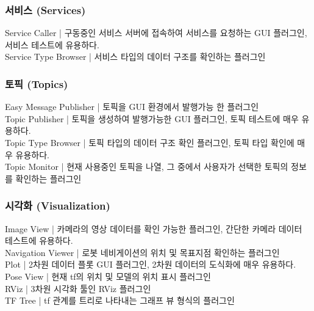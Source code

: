 \subsubsection{서비스 (Services)}
Service Caller | 구동중인 서비스 서버에 접속하여 서비스를 요청하는 GUI 플러그인, 서비스 테스트에 유용하다.\\
Service Type Browser | 서비스 타입의 데이터 구조를 확인하는 플러그인\\
\subsubsection{토픽 (Topics)}
Easy Message Publisher | 토픽을 GUI 환경에서 발행가능 한 플러그인\\
Topic Publisher | 토픽을 생성하여 발행가능한 GUI 플러그인, 토픽 테스트에 매우 유용하다.\\
Topic Type Browser | 토픽 타입의 데이터 구조 확인 플러그인, 토픽 타입 확인에 매우 유용하다.\\
Topic Monitor | 현재 사용중인 토픽을 나열, 그 중에서 사용자가 선택한 토픽의 정보를 확인하는 플러그인\\
\subsubsection{시각화 (Visualization)}
Image View | 카메라의 영상 데이터를 확인 가능한 플러그인, 간단한 카메라 데이터 테스트에 유용하다.\\
Navigation Viewer | 로봇 네비게이션의 위치 및 목표지점 확인하는 플러그인\\
Plot | 2차원 데이터 플롯 GUI 플러그인, 2차원 데이터의 도식화에 매우 유용하다.\\
Pose View | 현재 tf의 위치 및 모델의 위치 표시 플러그인\\
RViz | 3차원 시각화 툴인 RViz 플러그인\\
TF Tree | tf 관계를 트리로 나타내는 그래프 뷰 형식의 플러그인\\

